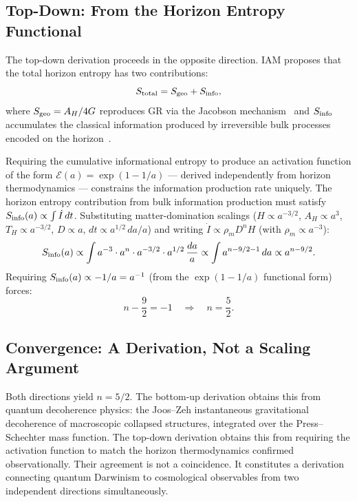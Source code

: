 \documentclass[12pt,a4paper]{article}
\begin{document}
\subsection{Top-Down: From the Horizon Entropy Functional}

The top-down derivation proceeds in the opposite direction. IAM proposes
that the total horizon entropy has two contributions:
\begin{equation}
S_{\rm total} = S_{\rm geo} + S_{\rm info},
\end{equation}
where $S_{\rm geo} = A_H/4G$ reproduces GR via the Jacobson
mechanism~\citep{Jacobson1995} and $S_{\rm info}$ accumulates the classical
information produced by irreversible bulk processes encoded on the
horizon~\citep{CaiKim2005}.

Requiring the cumulative informational entropy to produce an activation
function of the form $\mathcal{E}(a) = \exp(1 - 1/a)$ --- derived
independently from horizon thermodynamics --- constrains the information
production rate uniquely. The horizon entropy contribution from bulk
information production must satisfy $S_{\rm info}(a) \propto \int \dot{I}\,dt$.
Substituting matter-domination scalings ($H \propto a^{-3/2}$,
$A_H \propto a^3$, $T_H \propto a^{-3/2}$, $D \propto a$,
$dt \propto a^{1/2}\,da/a$) and writing $\dot{I} \propto \rho_m D^n H$
(with $\rho_m \propto a^{-3}$):
\begin{equation}
S_{\rm info}(a) \propto \int a^{-3} \cdot a^n \cdot a^{-3/2}
\cdot a^{1/2}\,\frac{da}{a} \propto \int a^{n - 9/2 - 1}\,da
\propto a^{n - 9/2}.
\end{equation}
Requiring $S_{\rm info}(a) \propto -1/a = a^{-1}$ (from the $\exp(1-1/a)$
functional form) forces:
\begin{equation}
n - \frac{9}{2} = -1 \quad\Longrightarrow\quad \boxed{n = \frac{5}{2}}.
\label{eq:n_topdown}
\end{equation}

\subsection{Convergence: A Derivation, Not a Scaling Argument}

Both directions yield $n = 5/2$. The bottom-up derivation obtains this from
quantum decoherence physics: the Joos--Zeh instantaneous gravitational
decoherence of macroscopic collapsed structures, integrated over the
Press--Schechter mass function. The top-down derivation obtains this from
requiring the activation function to match the horizon thermodynamics
confirmed observationally. Their agreement is not a coincidence. It
constitutes a derivation connecting quantum Darwinism to cosmological
observables from two independent directions simultaneously.
\end{document}
